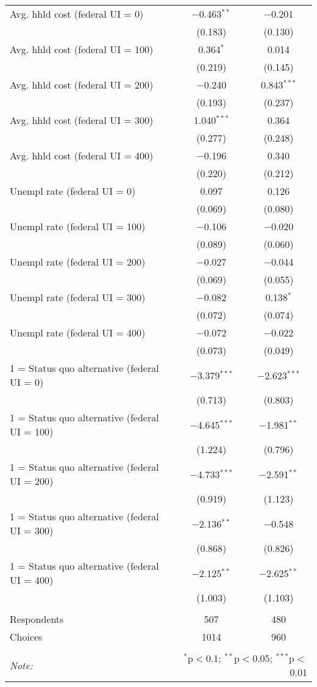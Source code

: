 \begin{table}[!htbp]
\begin{tabular}{@{\extracolsep{5pt}}lcc}
  Avg. hhld cost (federal UI = 0) & $-$0.463$^{**}$ & $-$0.201 \\ 
  & (0.183) & (0.130) \\ 
  Avg. hhld cost (federal UI = 100) & 0.364$^{*}$ & 0.014 \\ 
  & (0.219) & (0.145) \\ 
  Avg. hhld cost (federal UI = 200) & $-$0.240 & 0.843$^{***}$ \\ 
  & (0.193) & (0.237) \\ 
  Avg. hhld cost (federal UI = 300) & 1.040$^{***}$ & 0.364 \\ 
  & (0.277) & (0.248) \\ 
  Avg. hhld cost (federal UI = 400) & $-$0.196 & 0.340 \\ 
  & (0.220) & (0.212) \\ 
  Unempl rate (federal UI = 0) & 0.097 & 0.126 \\ 
  & (0.069) & (0.080) \\ 
  Unempl rate (federal UI = 100) & $-$0.106 & $-$0.020 \\ 
  & (0.089) & (0.060) \\ 
  Unempl rate (federal UI = 200) & $-$0.027 & $-$0.044 \\ 
  & (0.069) & (0.055) \\ 
  Unempl rate (federal UI = 300) & $-$0.082 & 0.138$^{*}$ \\ 
  & (0.072) & (0.074) \\ 
  Unempl rate (federal UI = 400) & $-$0.072 & $-$0.022 \\ 
  & (0.073) & (0.049) \\ 
  1 = Status quo alternative (federal UI = 0) & $-$3.379$^{***}$ & $-$2.623$^{***}$ \\ 
  & (0.713) & (0.803) \\ 
  1 = Status quo alternative (federal UI = 100) & $-$4.645$^{***}$ & $-$1.981$^{**}$ \\ 
  & (1.224) & (0.796) \\ 
  1 = Status quo alternative (federal UI = 200) & $-$4.733$^{***}$ & $-$2.591$^{**}$ \\ 
  & (0.919) & (1.123) \\ 
  1 = Status quo alternative (federal UI = 300) & $-$2.136$^{**}$ & $-$0.548 \\ 
  & (0.868) & (0.826) \\ 
  1 = Status quo alternative (federal UI = 400) & $-$2.125$^{**}$ & $-$2.625$^{**}$ \\ 
  & (1.003) & (1.103) \\ 
 \hline \\[-1.8ex] 
Respondents & 507 & 480\\ 
 Choices & 1014 & 960\\ 
\hline 
\hline \\[-1.8ex] 
\textit{Note:}  & \multicolumn{2}{r}{$^{*}$p$<$0.1; $^{**}$p$<$0.05; $^{***}$p$<$0.01} \\ 
\end{tabular} 
\end{table} 
